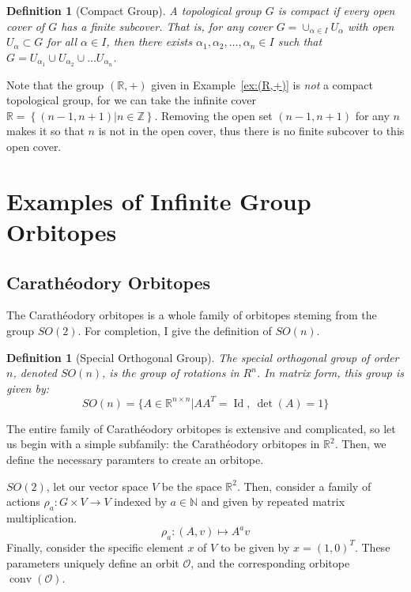\documentclass[12]{amsart}
\newtheorem{definition}[theorem]{Definition}
\newcommand{\R}[0]{\mathbb{R}}
\newcommand{\orb}[0]{\mathcal{O}}
\newcommand{\set}[1]{ \left\{ #1 \right\} }
\DeclareMathOperator{\id}{Id}
\DeclareMathOperator{\conv}{conv}
\begin{document}
\begin{definition}[Compact Group]
	A topological group $G$ is \emph{compact} if every open cover of $G$ has a finite subcover. That is, for any cover $G = \cup_{\alpha \in I} U_\alpha$ with open $U_\alpha \subset G$ for all $\alpha \in I$, then there exists $\alpha_1, \alpha_2, \dots, \alpha_n \in I$ such that $G = U_{\alpha_1} \cup U_{\alpha_2} \cup \dots U_{\alpha_n}$.
\end{definition}

Note that the group $(\mathbb{R}, +)$ given in Example~\ref{ex:(R,+)} is \emph{not} a compact topological group, for we can take the infinite cover $\mathbb{R} = \set{(n-1,n+1) | n \in \mathbb{Z}}$. Removing the open set $(n-1,n+1)$ for any $n$ makes it so that $n$ is not in the open cover, thus there is no finite subcover to this open cover. 

\section{Examples of Infinite Group Orbitopes}
\label{sec:infinite_exs}
\subsection{Carath\'{e}odory Orbitopes}

The Carath\'{e}odory orbitopes is a whole family of orbitopes steming from the group $SO(2)$. For completion, I give the definition of $SO(n)$.

\begin{definition}[Special Orthogonal Group]
    The special orthogonal group of order $n$, denoted $SO(n)$, is the group of rotations in $R^n$. In matrix form, this group is given by:
    \begin{equation*}
        SO(n) = \{ A \in \R^{n \times n} \vert AA^T = \id,\  \det(A) = 1 \}
    \end{equation*}
\end{definition}

The entire family of Carath\'{e}odory orbitopes is extensive and complicated,
so let us begin with a simple subfamily: the Carath\'{e}odory orbitopes in $\R^2$. Then, we define the necessary paramters to create an orbitope.

$SO(2)$, let our vector space $V$ be the space $\R^2$. Then, consider a family of actions $\rho_a: G \times V \to V$ indexed by $a \in \mathbb{N}$ and given by repeated matrix multiplication.
\begin{equation*}
    \rho_a: (A,v) \mapsto A^a v
\end{equation*}
Finally, consider the specific element $x$ of $V$ to be given by $x = (1,0)^T$. These parameters uniquely define an orbit $\orb$, and the corresponding orbitope $\conv(\orb)$.
\end{document}
